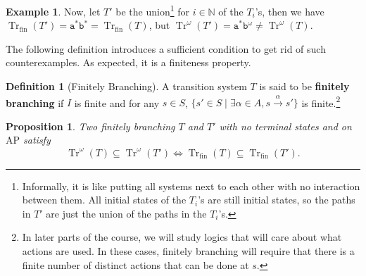 \documentclass{tufte-handout} %
\newtheorem{prop}[thm]{Proposition}
\theoremstyle{definition}
\newtheorem{defn}[thm]{Definition}
\newtheorem{exmp}[thm]{Example}
\theoremstyle{remark}
\newcommand{\N}{\mathbb{N}}
\newcommand{\0}{\textsf{0}}
\newcommand{\1}{\textsf{1}}
\newcommand{\AP}{\text{AP}}
\newcommand{\action}[1]{\stackrel{#1}{\rightarrow}}
\DeclareMathOperator{\Tr}{Tr}
\begin{document}
\begin{exmp}
	Now, let $T'$ be the union\footnote{Informally, it is like putting all systems next to each other with no interaction between them. All initial states of the $T_i$'s are still initial states, so the paths in $T'$ are just the union of the paths in the $T_i$'s.} for $i \in \N$ of the $T_i$'s, then we have $\Tr_{\text{fin}}(T') = \texttt{a}^*\texttt{b}^* = \Tr_{\text{fin}}(T)$, but $\Tr^{\omega}(T') = \texttt{a}^*\texttt{b}^{\omega} \neq \Tr^{\omega}(T) $.
\end{exmp}
The following definition introduces a sufficient condition to get rid of such counterexamples. As expected, it is a finiteness property.
\begin{defn}[Finitely Branching]
	A transition system $T$ is said to be \textbf{finitely branching} if $I$ is finite and for any $s \in S$, $\{s'\in S \mid \exists \alpha \in A, s \action{\alpha} s'\}$ is finite.\footnote{In later parts of the course, we will study logics that will care about what actions are used. In these cases, finitely branching will require that there is a finite number of distinct actions that can be done at $s$.}
\end{defn}
\begin{prop}\label{prop-finbranchtraces}
	Two finitely branching $T$ and $T'$ with no terminal states and on $\AP$ satisfy \[\Tr^{\omega}(T) \subseteq \Tr^{\omega}(T') \Leftrightarrow \Tr_{\text{fin}}(T) \subseteq \Tr_{\text{fin}}(T').\]
\end{prop}
\end{document}
